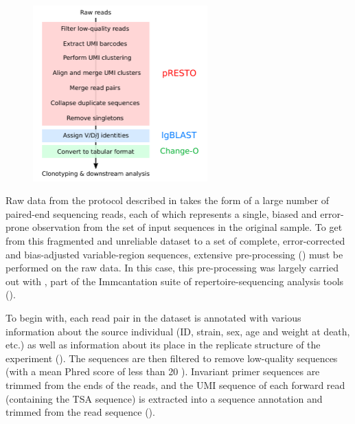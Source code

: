 \begin{figure}
\centering
\includegraphics[width=0.6\textwidth]{_Figures/png_edited/igseq-preprocessing}
\label{fig:igrace-preprocessing}
\vspace{0.5em}
\end{figure}

Raw \igseq data from the protocol described in  takes the form of a large number of paired-end sequencing reads, each of which represents a single, biased and error-prone observation from the set of input sequences in the original sample. To get from this fragmented and unreliable dataset to a set of complete, error-corrected and bias-adjusted \igh{} variable-region sequences, extensive pre-processing () must be performed on the raw data. In this case, this pre-processing was largely carried out with  \parencite{vanderheiden2014presto}, part of the Immcantation suite of repertoire-sequencing analysis tools ().

To begin with, each read pair in the dataset is annotated with various information about the source individual (ID, strain, sex, age and weight at death, etc.) as well as information about its place in the replicate structure of the experiment (). The sequences are then filtered to remove low-quality sequences (with a mean Phred score of less than 20 \parencite{ewing1998phred}). Invariant primer sequences are trimmed from the ends of the reads, and the UMI sequence of each forward read (containing the TSA sequence) is extracted into a sequence annotation and trimmed from the read sequence ().

